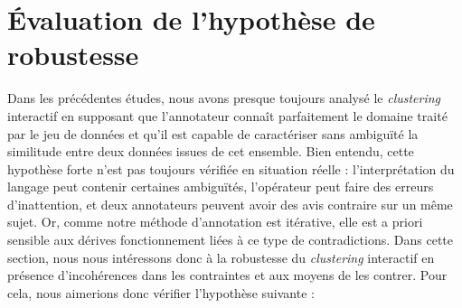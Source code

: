 \section{Évaluation de l'hypothèse de robustesse}
\label{section:4.6-HYPOTHESE-ROBUSTESSE}

	Dans les précédentes études, nous avons presque toujours analysé le \textit{clustering} interactif en supposant que l'annotateur connaît parfaitement le domaine traité par le jeu de données et qu'il est capable de caractériser sans ambiguïté la similitude entre deux données issues de cet ensemble.
	Bien entendu, cette hypothèse forte n'est pas toujours vérifiée en situation réelle : l'interprétation du langage peut contenir certaines ambiguïtés, l'opérateur peut faire des erreurs d’inattention, et deux annotateurs peuvent avoir des avis contraire sur un même sujet.
	Or, comme notre méthode d'annotation est itérative, elle est a priori sensible aux dérives fonctionnement liées à ce type de contradictions.
	Dans cette section, nous nous intéressons donc à la robustesse du \textit{clustering} interactif en présence d'incohérences dans les contraintes et aux moyens de les contrer.
	Pour cela, nous aimerions donc vérifier l'hypothèse suivante :
	
